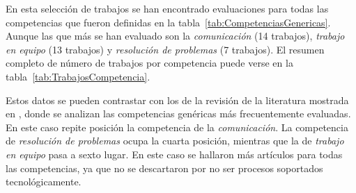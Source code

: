 
En esta selección de trabajos se han encontrado evaluaciones para todas las competencias que fueron definidas en la tabla~\ref{tab:CompetenciasGenericas}. Aunque las que más se han evaluado son la \emph{comunicación} (14 trabajos), \emph{trabajo en equipo} (13 trabajos) y \emph{resolución de problemas} (7 trabajos). El resumen completo de número de trabajos por competencia puede verse en la tabla~\ref{tab:TrabajosCompetencia}.

Estos datos se pueden contrastar con los de la revisión de la literatura mostrada en \cite{strijbos2015criteria}, donde se analizan las competencias genéricas más frecuentemente evaluadas. En este caso repite posición la competencia de la \emph{comunicación}. La competencia de \emph{resolución de problemas} ocupa la cuarta posición, mientras que la de \emph{trabajo en equipo} pasa a sexto lugar. En este caso se hallaron más artículos para todas las competencias, ya que no se descartaron por no ser procesos soportados tecnológicamente. 


